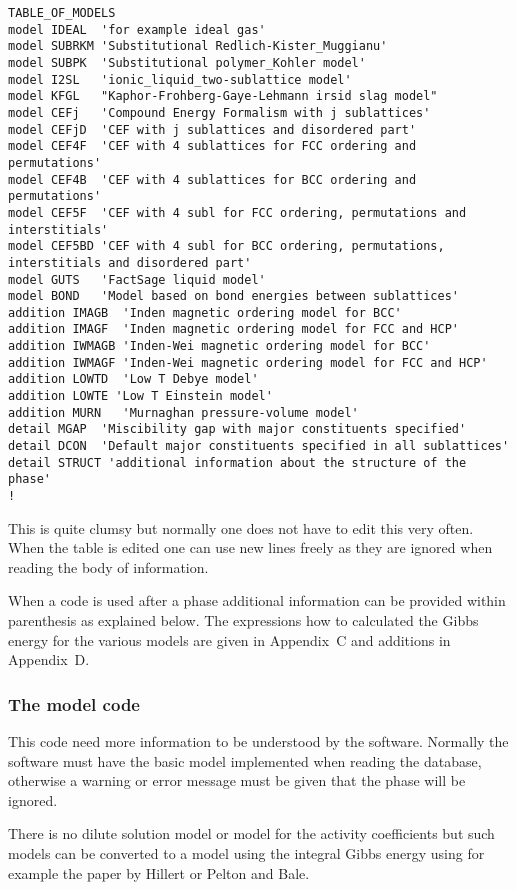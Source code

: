 \documentclass[12pt]{article}
\begin{document}
{\small
\begin{verbatim}
TABLE_OF_MODELS
model IDEAL  'for example ideal gas'
model SUBRKM 'Substitutional Redlich-Kister_Muggianu'
model SUBPK  'Substitutional polymer_Kohler model'
model I2SL   'ionic_liquid_two-sublattice model'
model KFGL   "Kaphor-Frohberg-Gaye-Lehmann irsid slag model"  
model CEFj   'Compound Energy Formalism with j sublattices'
model CEFjD  'CEF with j sublattices and disordered part'
model CEF4F  'CEF with 4 sublattices for FCC ordering and permutations'
model CEF4B  'CEF with 4 sublattices for BCC ordering and permutations'
model CEF5F  'CEF with 4 subl for FCC ordering, permutations and interstitials'
model CEF5BD 'CEF with 4 subl for BCC ordering, permutations, interstitials and disordered part'
model GUTS   'FactSage liquid model'
model BOND   'Model based on bond energies between sublattices'
addition IMAGB  'Inden magnetic ordering model for BCC'
addition IMAGF  'Inden magnetic ordering model for FCC and HCP'
addition IWMAGB 'Inden-Wei magnetic ordering model for BCC'
addition IWMAGF 'Inden-Wei magnetic ordering model for FCC and HCP'
addition LOWTD  'Low T Debye model'
addition LOWTE 'Low T Einstein model'
addition MURN   'Murnaghan pressure-volume model'
detail MGAP  'Miscibility gap with major constituents specified'
detail DCON  'Default major constituents specified in all sublattices'
detail STRUCT 'additional information about the structure of the phase'
!
\end{verbatim}
}

This is quite clumsy but normally one does not have to edit this
very often.  When the table is edited one can use new lines freely as
they are ignored when reading the body of information.

When a code is used after a phase additional information
can be provided within parenthesis as explained below.  The
expressions how to calculated the Gibbs energy for the various models
are given in Appendix~C and additions in Appendix~D.

\subsubsection{The model code}\label{sec:modcode}

This code need more information to be understood by the software.
Normally the software must have the basic model implemented when
reading the database, otherwise a warning or error message must be
given that the phase will be ignored.

There is no dilute solution model or model for the activity
coefficients but such models can be converted to a model using the
integral Gibbs energy using for example the paper by
Hillert\cite{86Hil} or Pelton and Bale\cite{86Pel}.
\end{document}
